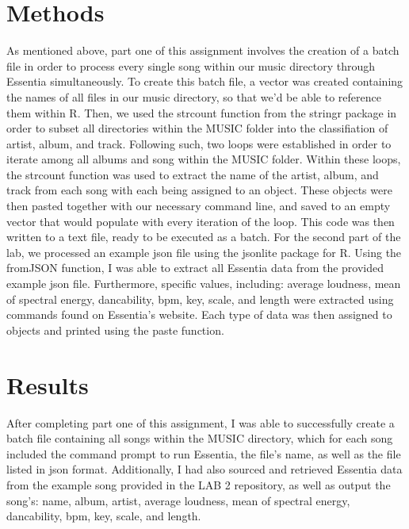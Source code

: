 \documentclass{article}\usepackage[]{graphicx}\usepackage[]{xcolor}
\begin{document}
\begin{multicols}{2}
\section{Methods}
 As mentioned above, part one of this assignment involves the creation of a batch file in order to process every single song within our music directory through Essentia simultaneously. To create this batch file, a vector was created containing the names of all files in our music directory, so that we'd be able to reference them within R. Then, we used the strcount function from the stringr package \citep{stringr} in order to subset all directories within the MUSIC folder into the classifiation of artist, album, and track. Following such, two loops were established in order to iterate among all albums and song within the MUSIC folder. Within these loops, the strcount function was used to extract the name of the artist, album, and track from each song with each being assigned to an object. These objects were then pasted together with our necessary command line, and saved to an empty vector that would populate with every iteration of the loop. This code was then written to a text file, ready to be executed as a batch. For the second part of the lab, we processed an example json file using the jsonlite package for R. Using the fromJSON function, I was able to extract all Essentia data from the provided example json file. Furthermore, specific values, including: average loudness, mean of spectral energy, dancability, bpm, key, scale, and length were extracted using commands found on Essentia's website. Each type of data was then assigned to objects and printed using the paste function.
 


\section{Results}
 After completing part one of this assignment, I was able to successfully create a batch file containing all songs within the MUSIC directory, which for each song included the command prompt to run Essentia, the file's name, as well as the file listed in json format. Additionally, I had also sourced and retrieved Essentia data from the example song provided in the LAB 2 repository, as well as output the song's: name, album, artist, average loudness, mean of spectral energy, dancability, bpm, key, scale, and length.




\vspace{2em}



\begin{tiny}

\end{tiny}
\end{multicols}

\newpage
\onecolumn
\end{document}
